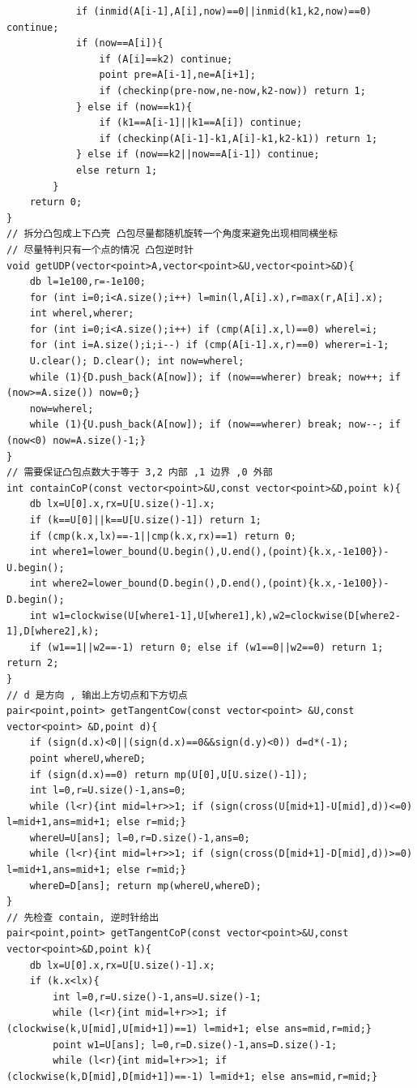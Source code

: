 \documentclass[twoside]{article}
\begin{document}
\begin{lstlisting}
			if (inmid(A[i-1],A[i],now)==0||inmid(k1,k2,now)==0) continue;
			if (now==A[i]){
				if (A[i]==k2) continue;
				point pre=A[i-1],ne=A[i+1];
				if (checkinp(pre-now,ne-now,k2-now)) return 1;
			} else if (now==k1){
				if (k1==A[i-1]||k1==A[i]) continue;
				if (checkinp(A[i-1]-k1,A[i]-k1,k2-k1)) return 1;
			} else if (now==k2||now==A[i-1]) continue;
			else return 1;
		}
	return 0;
}
// 拆分凸包成上下凸壳 凸包尽量都随机旋转一个角度来避免出现相同横坐标 
// 尽量特判只有一个点的情况 凸包逆时针
void getUDP(vector<point>A,vector<point>&U,vector<point>&D){
    db l=1e100,r=-1e100;
    for (int i=0;i<A.size();i++) l=min(l,A[i].x),r=max(r,A[i].x);
    int wherel,wherer;
    for (int i=0;i<A.size();i++) if (cmp(A[i].x,l)==0) wherel=i;
    for (int i=A.size();i;i--) if (cmp(A[i-1].x,r)==0) wherer=i-1;
    U.clear(); D.clear(); int now=wherel;
    while (1){D.push_back(A[now]); if (now==wherer) break; now++; if (now>=A.size()) now=0;}
    now=wherel;
    while (1){U.push_back(A[now]); if (now==wherer) break; now--; if (now<0) now=A.size()-1;}
}
// 需要保证凸包点数大于等于 3,2 内部 ,1 边界 ,0 外部
int containCoP(const vector<point>&U,const vector<point>&D,point k){
    db lx=U[0].x,rx=U[U.size()-1].x;
    if (k==U[0]||k==U[U.size()-1]) return 1;
    if (cmp(k.x,lx)==-1||cmp(k.x,rx)==1) return 0;
    int where1=lower_bound(U.begin(),U.end(),(point){k.x,-1e100})-U.begin();
    int where2=lower_bound(D.begin(),D.end(),(point){k.x,-1e100})-D.begin();
    int w1=clockwise(U[where1-1],U[where1],k),w2=clockwise(D[where2-1],D[where2],k);
    if (w1==1||w2==-1) return 0; else if (w1==0||w2==0) return 1; return 2;
}
// d 是方向 , 输出上方切点和下方切点
pair<point,point> getTangentCow(const vector<point> &U,const vector<point> &D,point d){
    if (sign(d.x)<0||(sign(d.x)==0&&sign(d.y)<0)) d=d*(-1);
    point whereU,whereD;
    if (sign(d.x)==0) return mp(U[0],U[U.size()-1]);
    int l=0,r=U.size()-1,ans=0;
    while (l<r){int mid=l+r>>1; if (sign(cross(U[mid+1]-U[mid],d))<=0) l=mid+1,ans=mid+1; else r=mid;}
    whereU=U[ans]; l=0,r=D.size()-1,ans=0;
    while (l<r){int mid=l+r>>1; if (sign(cross(D[mid+1]-D[mid],d))>=0) l=mid+1,ans=mid+1; else r=mid;}
    whereD=D[ans]; return mp(whereU,whereD);
}
// 先检查 contain, 逆时针给出
pair<point,point> getTangentCoP(const vector<point>&U,const vector<point>&D,point k){
    db lx=U[0].x,rx=U[U.size()-1].x;
    if (k.x<lx){
        int l=0,r=U.size()-1,ans=U.size()-1;
        while (l<r){int mid=l+r>>1; if (clockwise(k,U[mid],U[mid+1])==1) l=mid+1; else ans=mid,r=mid;}
        point w1=U[ans]; l=0,r=D.size()-1,ans=D.size()-1;
        while (l<r){int mid=l+r>>1; if (clockwise(k,D[mid],D[mid+1])==-1) l=mid+1; else ans=mid,r=mid;}

\end{lstlisting}
\end{document}
